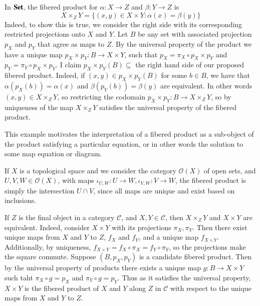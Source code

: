 \begin{example}
    In $\normalfont\textbf{Set}$, the fibered product for $\alpha:X\rightarrow Z$ and $\beta:Y\rightarrow Z$ is $$X\times_ZY = \{(x,y) \in X\times Y: \alpha(x) = \beta(y)\}$$
    Indeed, to show this is true, we consider the right side with its corresponding restricted projections onto $X$ and $Y$. Let $B$ be any set with associated projection $p_X$ and $p_Y$ that agree as maps to $Z$. By the universal property of the product we have a unique map $p_X\times p_Y:B\rightarrow X\times Y$, such that $p_X = \pi_X\circ p_X\times p_Y$ and $p_Y = \pi_Y\circ p_X\times p_Y$. I claim $p_X\times p_Y(B) \subseteq$ the right hand side of our proposed fibered product. Indeed, if $(x,y) \in p_X\times p_Y(B)$ for some $b \in B$, we have that $\alpha(p_X(b)) = \alpha(x)$ and $\beta(p_Y(b)) = \beta(y)$ are equivalent. In other words $(x,y) \in X\times_ZY$, so restricting the codomain $p_X\times p_Y:B\rightarrow X\times_ZY$, so by uniqueness of the map $X\times_ZY$ satisfies the universal property of the fibered product.
\end{example}

This example motivates the interpretation of a fibered product as a sub-object of the product satisfying a particular equation, or in other words the solution to some map equation or diagram.

\begin{example}
    If $X$ is a topological space and we consider the category $\mathscr{O}(X)$ of open sets, and $U, V, W \in \mathscr{O}(X)$, with maps $\iota_{U,W}:U\rightarrow W,\iota_{V,W}:V\rightarrow W$, the fibered product is simply the intersection $U\cap V$, since all maps are unique and exist based on inclusions.
\end{example}

\begin{example}
    If $Z$ is the final object in a category $\mathscr{C}$, and $X,Y \in \mathscr{C}$, then $X\times_ZY$ and $X\times Y$ are equivalent. Indeed, consider $X\times Y$ with its projections $\pi_X,\pi_Y$. Then there exist unique maps from $X$ and $Y$ to $Z$, $f_X$ and $f_Y$, and a unique map $f_{X\times Y}$. Additionally, by uniqueness, $f_{X\times Y} = f_X\circ \pi_X = f_Y\circ \pi_Y$, so the projections make the square commute. Suppose $(B,p_X,p_Y)$ is a candidate fibered product. Then by the universal property of products there exists a unique map $g:B\rightarrow X\times Y$ such taht $\pi_X\circ g = p_X$ and $\pi_Y\circ g = p_Y$. Thus as it satisfies the universal property, $X\times Y$ is the fibered product of $X$ and $Y$ along $Z$ in $\mathscr{C}$ with respect to the unique maps from $X$ and $Y$ to $Z$.
\end{example}

